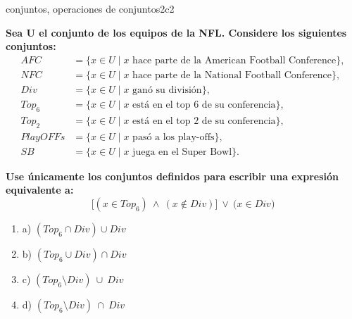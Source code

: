 \documentclass{article}
\begin{document}
\begin{question}{20}{conjuntos, operaciones de conjuntos}{2}{c}{2}{
\textbf{Sea U el conjunto de los equipos de la NFL. Considere los siguientes conjuntos:}
\[
\begin{aligned}
AFC &= \{ x \in U \mid x \text{ hace parte de la American Football Conference}\},\\
NFC &= \{ x \in U \mid x \text{ hace parte de la National Football Conference}\},\\
Div &= \{ x \in U \mid x \text{ ganó su división}\},\\
Top_6 &= \{ x \in U \mid x \text{ está en el top 6 de su conferencia}\},\\
Top_2 &= \{ x \in U \mid x \text{ está en el top 2 de su conferencia}\},\\
PlayOFFs &= \{ x \in U \mid x \text{ pasó a los play-offs}\},\\
SB &= \{ x \in U \mid x \text{ juega en el Super Bowl}\}.
\end{aligned}
\]

\textbf{Use únicamente los conjuntos definidos para escribir una expresión equivalente a:} 
\[
\bigl[(x \in Top_6)\ \land\ (x \not\in Div)\bigr]\ \lor\ \bigl(x \in Div\bigr)
\]

\begin{enumerate}
    \item a) \((Top_6 \cap Div) \cup Div\)
    \item b) \((Top_6 \cup Div) \cap Div\)
    \item c) \((Top_6 \setminus Div)\ \cup\ Div\)
    \item d) \((Top_6 \setminus Div)\ \cap\ Div\)
\end{enumerate}
}
\end{question}
\end{document}
